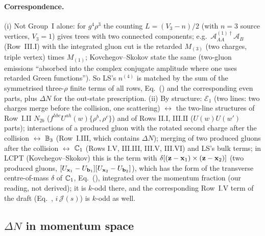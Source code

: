 \paragraph{Correspondence.} (i) Not Group~I alone: for $g^4\rho^3$ the counting $L=(V_3-n)/2$ (with $n=3$ source vertices, $V_3=1$) gives trees with two connected components; e.g.\ $\mathcal A^{(1)\dagger}_{AA}\mathcal A_B$ (Row~III.I) with the integrated gluon cut is the retarded $M_{(3)}$ (two charges, triple vertex) times $M_{(1)}$; Kovchegov--Skokov state the same (two-gluon emissions ``absorbed into the complex conjugate amplitude where one uses retarded Green functions''). So LS's $n^{(4)}$ is matched by the sum of the symmetrised three-$\rho$ finite terms of all rows, Eq.~() and the corresponding even parts, plus $\Delta N$ for the out-state prescription. (ii) By structure: $\mathcal E_1$ (two lines: two charges merge before the collision, one scattering) $\leftrightarrow$ the two-line structures of Row~I.II $N_{2b}$ ($f^{hbc}U^{ah}(w)\{\rho^b,\rho^c\}$) and of Rows II.I, III.II ($U(w)U(w')$ parts); interactions of a produced gluon with the rotated second charge after the collision $\leftrightarrow$ $\mathbb{B}_3$ (Row~I.III, which contains $\Delta N$); merging of two produced gluons after the collision $\leftrightarrow$ $\mathbb{C}_1$ (Rows I.V, III.III, III.V, III.VI) and LS's bulk terms; in LCPT (Kovchegov--Skokov) this is the term with $\delta[(\mathbf{z}-\mathbf{x}_1)\times(\mathbf{z}-\mathbf{x}_2)]$ (two produced gluons, $[U_{\mathbf{x}_1}-U_{\mathbf{b}_1}][U_{\mathbf{x}_2}-U_{\mathbf{b}_2}]$), which has the form of the transverse centre-of-mass $\delta$ of $\mathbb{C}_1$, Eq.~(), integrated over the momentum fraction (our reading, not derived); it is $k$-odd there, and the corresponding Row~I.V term of the draft (Eq.~, $i\,\mathcal J(s)$) is $k$-odd as well.

\subsection{$\Delta N$ in momentum space}\label{ls:DN}
